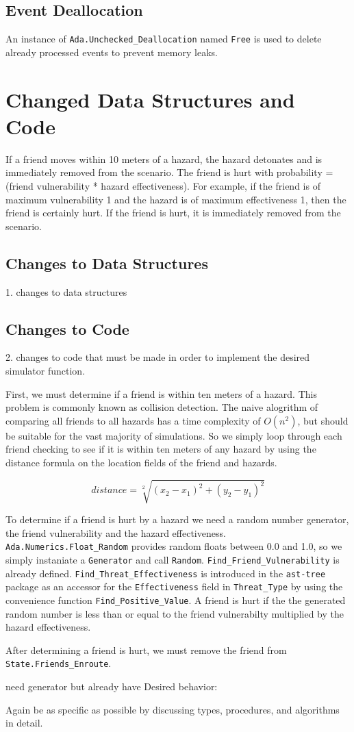 \documentclass[12pt,letterpaper,titlepage]{article}
\newcommand{\code}[1]{\texttt{#1}}
\begin{document}
\subsection{Event Deallocation}

An instance of \code{Ada.Unchecked_Deallocation} named \code{Free} is
used to delete already processed events to prevent memory leaks.


\section{Changed Data Structures and Code}

If a friend moves within 10 meters of a hazard, the hazard detonates
and is immediately removed from the scenario.  The friend is hurt with
probability = (friend vulnerability * hazard effectiveness).  For
example, if the friend is of maximum vulnerability 1 and the hazard is
of maximum effectiveness 1, then the friend is certainly hurt.  If the
friend is hurt, it is immediately removed from the scenario.

\subsection{Changes to Data Structures}
1. changes to data structures


\subsection{Changes to Code}
2. changes to code that must be made in order to implement the desired
simulator function.

First, we must determine if a friend is within ten meters of a hazard.
This problem is commonly known as collision detection.  The naive
alogrithm of comparing all friends to all hazards has a time
complexity of $O(n^2)$, but should be suitable for the vast majority
of simulations.  So we simply loop through each friend checking to see
if it is within ten meters of any hazard by using the distance formula
on the location fields of the friend and hazards.


\[distance = \sqrt[2]{(x_2-x_1)^2 + (y_2-y_1)^2}\]


To determine if a friend is hurt by a hazard we need a random number
generator, the friend vulnerability and the hazard effectiveness.
\code{Ada.Numerics.Float_Random} provides random floats between 0.0
and 1.0, so we simply instaniate a \code{Generator} and call
\code{Random}. \code{Find_Friend_Vulnerability} is already defined.
\code{Find_Threat_Effectiveness} is introduced in the \code{ast-tree}
package as an accessor for the \code{Effectiveness} field in
\code{Threat_Type} by using the convenience function
\code{Find_Positive_Value}.  A friend is hurt if the the generated
random number is less than or equal to the friend vulnerabilty
multiplied by the hazard effectiveness.

After determining a friend is hurt, we must remove the friend from
\code{State.Friends_Enroute}.





need generator but already have 
Desired behavior:


Again be as specific as possible by discussing types, procedures, and
algorithms in detail.
\end{document}
